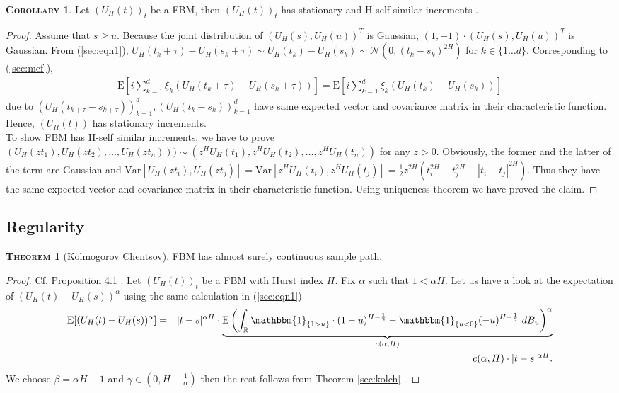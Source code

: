 \documentclass[a4paper, twoside, 11pt]{article}
\theoremstyle{definition}
\newtheorem{theorem}[definition]{\scshape Theorem}
\newtheorem{corollary}[definition]{\scshape Corollary}
\newcommand{\brkt}[1]{\left({#1} \right)}
\begin{document}
\begin{corollary}
  Let $(U_H(t))_{t}$ be a FBM, then $(U_H(t))_{t}$ has stationary and H-self similar increments . 
\end{corollary}
\begin{proof}
  Assume that $s \ge u $. Because the joint distribution of $(U_H(s), U_H(u))^T$ is Gaussian, $(1, -1) \cdot (U_H(s), U_H(u))^T $ is Gaussian. From (\ref{sec:eqn1}),  $U_H(t_k+\tau) - U_H(s_k+\tau) \sim U_H(t_k) - U_H(s_k) \sim \mathcal{N}(0, (t_k - s_k)^{2H})$ for $k \in \{1\dots d\}$. Corresponding to  (\ref{sec:mcf}), 
	\begin{eqnarray*}
	\mathrm{E}[i\sum_{k=1}^{d}\xi_k (U_H(t_k + \tau) - U_H(s_k + \tau))] = \mathrm{E} [i\sum_{k=1}^{d}\xi_k (U_H(t_k) - U_H(s_k))]
  \end{eqnarray*}
  due to $(U_H(t_{k+\tau} - s_{k+\tau}))_{k=1}^{d}, (U_H(t_k - s_k))_{k=1}^{d}$ have same expected vector and covariance matrix in their characteristic function.  Hence, $(U_H(t))$ has stationary increments.\\
   To show FBM has H-self similar increments, we have to prove\\ $(U_H(zt_1), U_H(zt_2),\dots, U_H(zt_n))) \sim (z^HU_H(t_1), z^HU_H(t_2),\dots, z^HU_H(t_n))$ for any $z > 0$. Obviously, the former and the latter of the term are Gaussian and $\mathrm{Var}[U_H(zt_i), U_H(zt_j)] = \mathrm{Var}[z^HU_H(t_i), z^HU_H(t_j)] = \frac{1}{2}z^{2H}(t_i^{2H} + t_j^{2H} - |t_i-t_j|^{2H})$. Thus they have the same expected vector and covariance matrix in their characteristic function. Using uniqueness theorem we have proved the claim. 
\end{proof}

\subsection{Regularity}
\begin{theorem}[Kolmogorov Chentsov]
  FBM has almost surely continuous sample path.  
\end{theorem}

\begin{proof}
  Cf.\cite{mandelbrot} Proposition 4.1 . Let $(U_H(t))_{t}$ be a FBM with Hurst index $H$. Fix $\alpha$ such that $1 < \alpha H$. Let us have a look at the expectation of $(U_H(t) - U_H(s))^\alpha$ using the same calculation in (\ref{sec:eqn1})
  \begin{eqnarray}
	\mathrm{E} [(U_H(t) - U_H(s))^\alpha] &=& |t-s|^{\alpha H} \cdot \underbrace{\mathrm{E}\brkt{\int_{\mathbb{R}} \mathbbm{1}_{\{1 > u\}}\cdot (1-u)^{H-\frac{1}{2}} - \mathbbm{1}_{\{u < 0\}} (-u)^{H-\frac{1}{2}} \, \mathop{dB_u}}^\alpha}_{c(\alpha,H)}\nonumber\\
	&=& c(\alpha,H) \cdot |t-s|^{\alpha H}.
	\label{sec:eqn5}
  \end{eqnarray}
  We choose $\beta = \alpha H -1$ and $\gamma \in (0, H-\frac{1}{\alpha})$ then the rest follows from Theorem \ref{sec:kolch} .
\end{proof}
\end{document}
